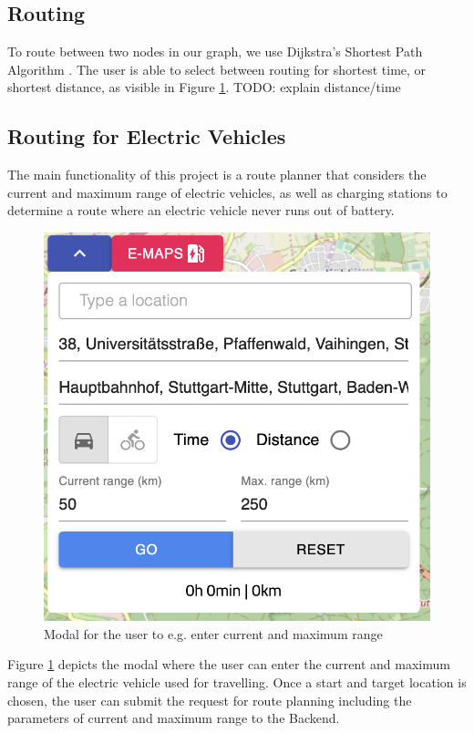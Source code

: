 \documentclass[a4paper]{article}
\begin{document}
\subsection{Routing}
To route between two nodes in our graph, we use Dijkstra's Shortest Path Algorithm \cite{Dijkstra1959}.
The user is able to select between routing for shortest time, or shortest distance, as visible in Figure \ref{fig:input}.
TODO: explain distance/time
\subsection{Routing for Electric Vehicles}
The main functionality of this project is a route planner that considers the current and maximum range of electric vehicles, as well as charging stations to determine a route where an electric vehicle never runs out of battery.
\begin{figure}[h]
    \centering
    \includegraphics[scale=0.6]{figures/input}
    \caption{Modal for the user to e.g. enter current and maximum range}
    \label{fig:input}
\end{figure}
Figure \ref{fig:input} depicts the modal where the user can enter the current and maximum range of the electric vehicle used for travelling.
Once a start and target location is chosen, the user can submit the request for route planning including the parameters of current and maximum range to the Backend.
\end{document}
